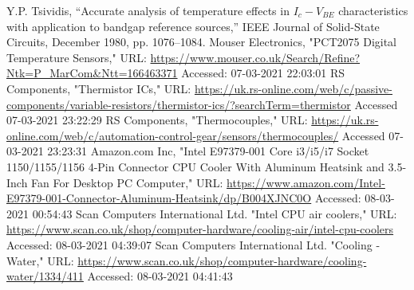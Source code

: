 \documentclass[conference]{IEEEtran}
\begin{document}
\begin{thebibliography}{00}
 Y.P. Tsividis, “Accurate analysis of temperature effects in $I_c - V_{BE}$ characteristics with application to bandgap reference sources,” IEEE Journal of Solid-State Circuits, December 1980, pp. 1076–1084.
 Mouser Electronics, "PCT2075 Digital Temperature Sensors," URL: \url{https://www.mouser.co.uk/Search/Refine?Ntk=P_MarCom&Ntt=166463371} Accessed: 07-03-2021 22:03:01
 RS Components, "Thermistor ICs," URL: \url{https://uk.rs-online.com/web/c/passive-components/variable-resistors/thermistor-ics/?searchTerm=thermistor} Accessed 07-03-2021 23:22:29
 RS Components, "Thermocouples," URL: \url{https://uk.rs-online.com/web/c/automation-control-gear/sensors/thermocouples/} Accessed 07-03-2021 23:23:31
 Amazon.com Inc, "Intel E97379-001 Core i3/i5/i7 Socket 1150/1155/1156 4-Pin Connector CPU Cooler With Aluminum Heatsink and 3.5-Inch Fan For Desktop PC Computer," URL: \url{https://www.amazon.com/Intel-E97379-001-Connector-Aluminum-Heatsink/dp/B004XJNC0O} Accessed: 08-03-2021 00:54:43
 Scan Computers International Ltd. "Intel CPU air coolers," URL: \url{https://www.scan.co.uk/shop/computer-hardware/cooling-air/intel-cpu-coolers} Accessed: 08-03-2021 04:39:07
 Scan Computers International Ltd. "Cooling - Water," URL: \url{https://www.scan.co.uk/shop/computer-hardware/cooling-water/1334/411} Accessed: 08-03-2021 04:41:43
\end{thebibliography}
\end{document}

